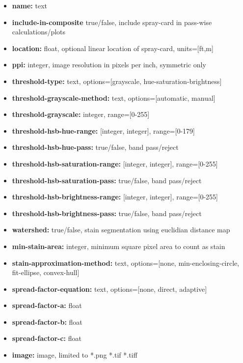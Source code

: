 \documentclass[10pt,letterpaper,titlepage]{article}
\begin{document}
\begin{itemize}
\begin{itemize}
\begin{itemize}
\begin{itemize}
                    \item \textbf{name:} text
                    \item \textbf{include-in-composite} true/false, include spray-card in pass-wise calculations/plots
                    \item \textbf{location:} float, optional linear location of spray-card, units=[ft,m]
                    \item \textbf{ppi:} integer, image resolution in pixels per inch, symmetric only
                    \item \textbf{threshold-type:} text, options=[grayscale, hue-saturation-brightness]
                    \item \textbf{threshold-grayscale-method:} text, options=[automatic, manual]
                    \item \textbf{threshold-grayscale:} integer, range=[0-255]
                    \item \textbf{threshold-hsb-hue-range:} [integer, integer], range=[0-179]
                    \item \textbf{threshold-hsb-hue-pass:} true/false, band pass/reject
                    \item \textbf{threshold-hsb-saturation-range:} [integer, integer], range=[0-255]
                    \item \textbf{threshold-hsb-saturation-pass:} true/false, band pass/reject
                    \item \textbf{threshold-hsb-brightness-range:} [integer, integer], range=[0-255]
                    \item \textbf{threshold-hsb-brightness-pass:} true/false, band pass/reject
                    \item \textbf{watershed:} true/false, stain segmentation using euclidian distance map
                    \item \textbf{min-stain-area:} integer, minimum square pixel area to count as stain
                    \item \textbf{stain-approximation-method:} text, options=[none, min-enclosing-circle, fit-ellipse, convex-hull]
                    \item \textbf{spread-factor-equation:} text, options=[none, direct, adaptive]
                    \item \textbf{spread-factor-a:} float
                    \item \textbf{spread-factor-b:} float
                    \item \textbf{spread-factor-c:} float
                    \item \textbf{image:} image, limited to *.png *.tif *.tiff
                \end{itemize}
            \end{itemize}
        \end{itemize}
    \end{itemize}
\end{document}
